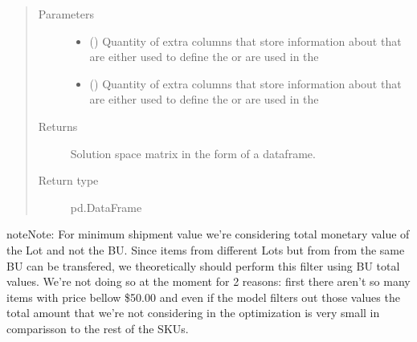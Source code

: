 \documentclass[letterpaper,10pt,english]{sphinxmanual}
\begin{document}
\begin{fulllineitems}
\begin{itemize}
\end{itemize}
\begin{quote}\begin{description}
\item[{Parameters}] \leavevmode\begin{itemize}
\item {} 
 () \textendash{} Quantity of extra columns that store information about  that are either used to define the 
or are used in the 

\item {} 
 () \textendash{} Quantity of extra columns that store information about  that are either used to define the 
or are used in the 

\end{itemize}

\item[{Returns}] \leavevmode
Solution space matrix in the form of a dataframe.

\item[{Return type}] \leavevmode
pd.DataFrame

\end{description}\end{quote}

\begin{sphinxadmonition}{note}{Note:}
For minimum shipment value we’re considering total monetary value of the Lot
and not the BU. Since items from different Lots but from from the same BU can
be transfered, we theoretically should perform this filter using BU total values.
We’re not doing so at the moment for 2 reasons: first there aren’t so many items
with price bellow \$50.00 and even if the model filters out those values the total
amount that we’re not considering in the optimization is very small in comparisson
to the rest of the SKUs.
\end{sphinxadmonition}






\end{fulllineitems}
\end{document}
